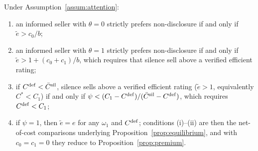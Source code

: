 \label{prop:att_incentives}
Under Assumption~\ref{assum:attention}:
\begin{enumerate}[label=(\roman*)]
    \item an informed seller with $\theta=0$ strictly prefers non-disclosure if and only if $\tilde e>c_0/b$;
    \item an informed seller with $\theta=1$ strictly prefers non-disclosure if and only if $\tilde e>1+(c_0+c_1)/b$, which requires that silence sell above a verified efficient rating;
    \item if $C^{\rm def}<\bar C^{\rm sil}$, silence sells above a verified efficient rating ($\tilde e>1$, equivalently $C^*<C_1$) if and only if $\psi<(C_1-C^{\rm def})/(\bar C^{\rm sil}-C^{\rm def})$, which requires $C^{\rm def}<C_1$;
    \item if $\psi=1$, then $\tilde e=e$ for any $\omega_1$ and $C^{\rm def}$; conditions (i)--(ii) are then the net-of-cost comparisons underlying Proposition~\ref{prop:equilibrium}, and with $c_0=c_1=0$ they reduce to Proposition~\ref{prop:premium}.
\end{enumerate}
